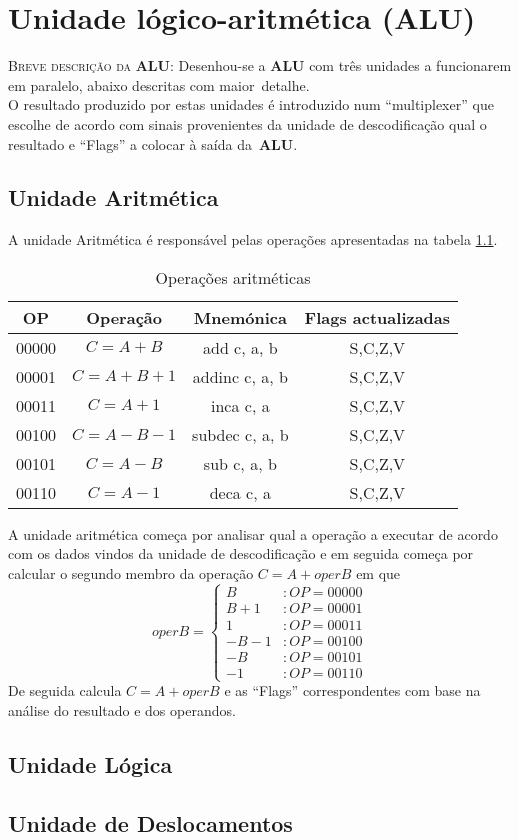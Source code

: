 \documentclass[11pt,a4paper,titlepage,onecolumn]{report}
\begin{document}
	\chapter{Unidade lógico-aritmética (ALU)}
	\textsc{Breve descrição da \textbf{ALU}: } Desenhou-se a \textbf{ALU} com três unidades a funcionarem em paralelo, abaixo descritas com maior~detalhe.\\
	O resultado produzido por estas unidades é introduzido num ``multiplexer'' que escolhe de acordo com sinais provenientes da unidade de descodificação qual o resultado e ``Flags'' a colocar à saída da~\textbf{ALU}.
	
	\section{Unidade Aritmética}
	A unidade Aritmética é responsável pelas operações apresentadas na tabela \ref{tabela:arith}.\\
		
	\begin{table}[h]
		\centering
		\begin{tabular}{|c|c|c|c|}
			\hline
			OP    & Operação & Mnemónica & Flags actualizadas \\ \hline
			00000 & \mbox{$C=A+B$}    & add c, a, b    & S,C,Z,V   \\ \hline
			00001 & \mbox{$C=A+B+1$}  & addinc c, a, b & S,C,Z,V   \\ \hline
			00011 & \mbox{$C=A+1$}    & inca c, a      & S,C,Z,V   \\ \hline
			00100 & \mbox{$C=A-B-1$}  & subdec c, a, b & S,C,Z,V   \\ \hline
			00101 & \mbox{$C=A-B$}    & sub c, a, b    & S,C,Z,V   \\ \hline
			00110 & \mbox{$C=A-1$}    & deca c, a      & S,C,Z,V   \\ \hline
		\end{tabular}
		\caption{Operações aritméticas}
		\label{tabela:arith}
	\end{table}
	
	A unidade aritmética começa por analisar qual a operação a executar de acordo com os dados vindos da unidade de descodificação e em seguida começa por calcular o segundo membro da operação \mbox{$C=A+operB$} em que 
	\[ operB=\left\{
		\begin{array}{lr}
		B & : OP=00000\\
		B+1 & : OP=00001\\
		1 & : OP=00011\\
		-B-1 & : OP=00100\\
		-B & : OP=00101\\
		-1 & : OP=00110
		\end{array}
		\right.\]
	De seguida calcula \mbox{$C=A+operB$} e as ``Flags'' correspondentes com base na análise do resultado e dos operandos.
	
	\section{Unidade Lógica}
	
	\section{Unidade de Deslocamentos}
	
\end{document}
